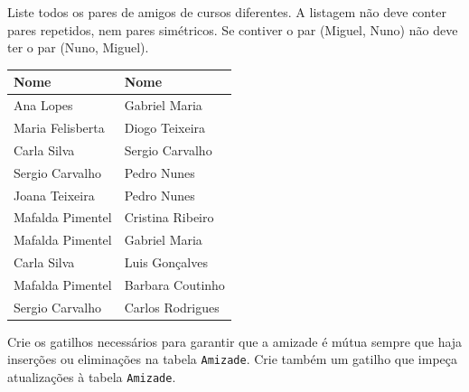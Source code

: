 \documentclass[type=recurso, year=2015/16]{bdad_exam}
\begin{document}
{\newpage
{}
Liste todos os pares de amigos de cursos diferentes. A listagem não deve conter pares repetidos, nem pares simétricos. Se contiver o par (Miguel, Nuno) não deve ter o par (Nuno, Miguel).
\begin{center} \begin{tabular}{l l}
    \textbf{Nome}    & \textbf{Nome}    \\ \hline
    Ana Lopes        & Gabriel Maria    \\
    Maria Felisberta & Diogo Teixeira   \\
    Carla Silva      & Sergio Carvalho  \\
    Sergio Carvalho  & Pedro Nunes      \\
    Joana Teixeira   & Pedro Nunes      \\
    Mafalda Pimentel & Cristina Ribeiro \\
    Mafalda Pimentel & Gabriel Maria    \\
    Carla Silva      & Luis Gonçalves   \\
    Mafalda Pimentel & Barbara Coutinho \\
    Sergio Carvalho  & Carlos Rodrigues
\end{tabular} \end{center}


Crie os gatilhos necessários para garantir que a amizade é mútua sempre que haja inserções ou eliminações na tabela \texttt{Amizade}. Crie também um gatilho que impeça atualizações à tabela \texttt{Amizade}.


}
\end{document}
